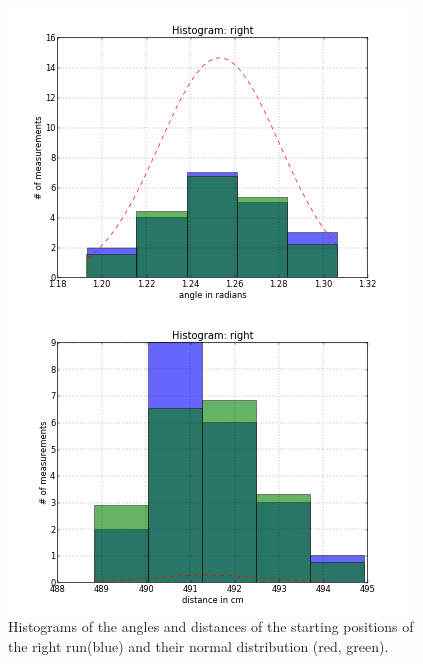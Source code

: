\documentclass{scrartcl}
\begin{document}
\begin{figure}[H]
\centering
\begin{minipage}{.5\textwidth}
  \centering
  \includegraphics[width=1.0\linewidth]{img/Angles_right_s.png}
\end{minipage}%
\begin{minipage}{.5\textwidth}
  \centering
  \includegraphics[width=1.0\linewidth]{img/Distances_right_s.png}
\end{minipage}
\caption{Histograms of the angles and distances of  the starting positions of the right run(blue) and their normal distribution (red, green).}
\end{figure}
\end{document}
